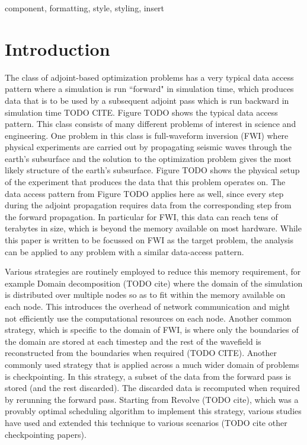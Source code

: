 \documentclass[conference]{IEEEtran}
\begin{document}
\begin{IEEEkeywords}
component, formatting, style, styling, insert
\end{IEEEkeywords}

\section{Introduction}
The class of adjoint-based optimization problems has a very typical data access pattern where a
simulation is run ``forward" in simulation time, which produces data that is to be used by a
subsequent adjoint pass which is run backward in simulation time TODO CITE. Figure TODO
shows the typical data access pattern. This class consists of many different problems of interest in
science and engineering. One problem in this class is full-waveform inversion (FWI) where physical
experiments are carried out by propagating seismic waves through the earth's subsurface and the
solution to the optimization problem gives the most likely structure of the earth's subsurface. Figure
TODO shows the physical setup of the experiment that produces the data that this problem operates
on. The data access pattern from Figure TODO applies here as well, since every step during the
adjoint propagation requires data from the corresponding step from the forward propagation. In
particular for FWI, this data can reach tens of terabytes in size, which is beyond the memory
available on most hardware. While this paper is written to be focussed on FWI as the target problem, 
the analysis can be applied to any problem with a similar data-access pattern. 


Various strategies are routinely employed to reduce this memory requirement, for example 
Domain decomposition (TODO cite) where the domain of the simulation is distributed over
multiple nodes so as to fit within the memory available on each node. This introduces the overhead
of network communication and might not efficiently use the computational resources on each node.
Another common strategy, which is specific to the domain of FWI, is where only the boundaries of
the domain are stored at each timestep and the rest of the wavefield is reconstructed from the
boundaries when required (TODO CITE). Another commonly used strategy that is applied across
a much wider domain of problems is checkpointing. In this strategy, a subset of the data from the
forward pass is stored (and the rest discarded). The discarded data is recomputed when required
by rerunning the forward pass. Starting from Revolve (TODO cite), which was a provably optimal
scheduling algorithm to implement this strategy, various studies have used and extended this
technique to various scenarios (TODO cite other checkpointing papers). 
\end{document}
